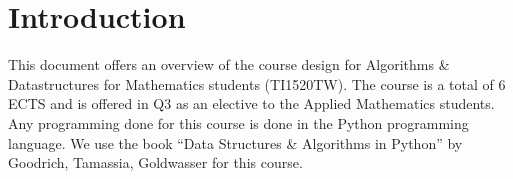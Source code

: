 \section{Introduction}
\label{sec:introduction}

This document offers an overview of the course design for Algorithms \& Datastructures for Mathematics students
(TI1520TW). The
course is a total of 6 ECTS and is offered in Q3 as an elective to the Applied Mathematics students. Any programming
done for this course is done in the Python programming language.
We use the book ``Data Structures \& Algorithms in Python'' by Goodrich, Tamassia, Goldwasser
for this course.
